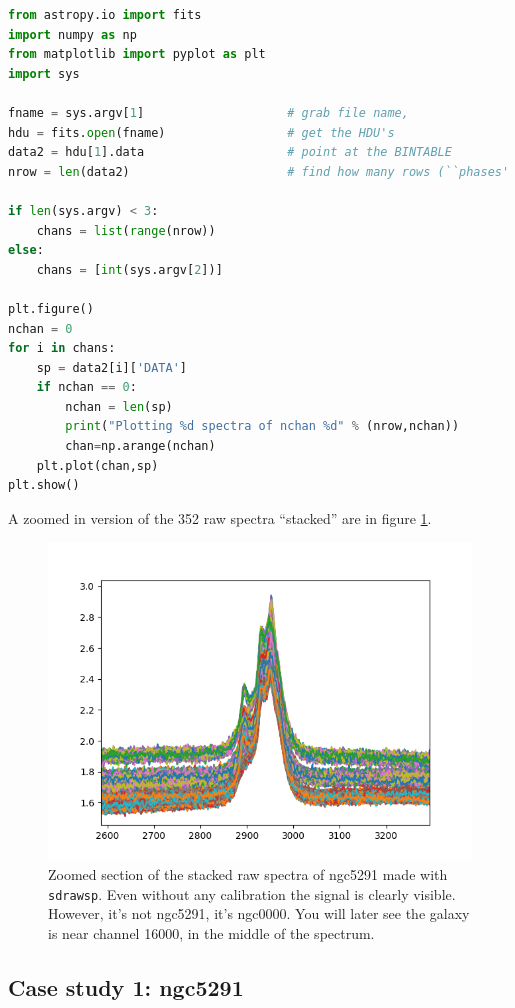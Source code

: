 \documentclass[12pt,a4paper]{article}
\begin{document}
\begin{lstlisting}[language=python]
from astropy.io import fits
import numpy as np
from matplotlib import pyplot as plt
import sys

fname = sys.argv[1]                    # grab file name, 
hdu = fits.open(fname)                 # get the HDU's
data2 = hdu[1].data                    # point at the BINTABLE
nrow = len(data2)                      # find how many rows (``phases'')

if len(sys.argv) < 3:
    chans = list(range(nrow))
else:
    chans = [int(sys.argv[2])]

plt.figure()
nchan = 0
for i in chans:
    sp = data2[i]['DATA']
    if nchan == 0:
        nchan = len(sp)
        print("Plotting %d spectra of nchan %d" % (nrow,nchan))
        chan=np.arange(nchan)
    plt.plot(chan,sp)
plt.show() 
\end{lstlisting}

A zoomed in version of the 352 raw spectra ``stacked'' are in figure \ref{spectrum2}.

\begin{figure}[h]
\centering
  \includegraphics[width=\textwidth]{sdrawsp1.png}
  \caption{\label{spectrum2} Zoomed section of the stacked raw spectra of ngc5291 made with {\tt sdrawsp}.
    Even without any calibration the signal is clearly visible. However, it's not ngc5291, it's ngc0000.
    You will later see the galaxy is near channel 16000, in the middle of the spectrum.}
\end{figure}


\subsection{Case study 1: ngc5291}
\end{document}
